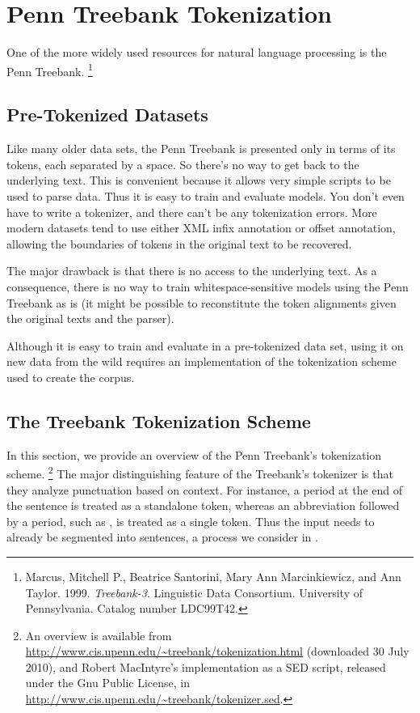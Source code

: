 
\section{Penn Treebank Tokenization}

One of the more widely used resources for natural language
processing is the Penn Treebank.%
%
\footnote{Marcus, Mitchell P., Beatrice Santorini, Mary Ann
  Marcinkiewicz, and Ann Taylor. 1999. {\it Treebank-3}. Linguistic
  Data Consortium.  University of Pennsylvania.  Catalog number
  LDC99T42.}
%

\subsection{Pre-Tokenized Datasets}

Like many older data sets, the Penn Treebank is presented only in
terms of its tokens, each separated by a space.  So there's no way to
get back to the underlying text.  This is convenient because it allows
very simple scripts to be used to parse data.  Thus it is easy to
train and evaluate models.  You don't even have to write a tokenizer,
and there can't be any tokenization errors.  More modern datasets tend
to use either XML infix annotation or offset annotation, allowing the
boundaries of tokens in the original text to be recovered.

The major drawback is that there is no access to the underlying text.
As a consequence, there is no way to train whitespace-sensitive models
using the Penn Treebank as is (it might be possible to reconstitute
the token alignments given the original texts and the parser).

Although it is easy to train and evaluate in a pre-tokenized data
set, using it on new data from the wild requires an implementation
of the tokenization scheme used to create the corpus.

\subsection{The Treebank Tokenization Scheme}

In this section, we provide an overview of the Penn Treebank's
tokenization scheme.%
%
\footnote{An overview is available from
  \url{http://www.cis.upenn.edu/~treebank/tokenization.html}
  (downloaded 30 July 2010), and Robert MacIntyre's implementation as
  a SED script, released under the Gnu Public License, in
  \url{http://www.cis.upenn.edu/~treebank/tokenizer.sed}.}
%
The major distinguishing feature of the Treebank's tokenizer is that
they analyze punctuation based on context.  For instance, a period at
the end of the sentence is treated as a standalone token, whereas an
abbreviation followed by a period, such as , is
treated as a single token.  Thus the input needs to already be
segmented into sentences, a process we consider in
.

